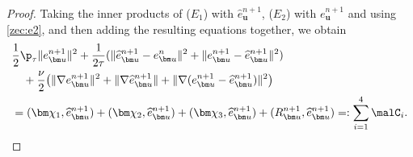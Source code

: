 \begin{proof}
	Taking the inner products of ($E_1$) with $\widehat{e}_{\bm u}^{n+1}$, ($E_2$) with $e_{\bm u}^{n+1}$ and using \eqref{zec:e2}, and then adding the resulting equations together, we obtain
	\begin{equation} \label{err:euhat:1}
		\begin{aligned}
			& \frac{1}{2}\p_\tau \|e_{\bm u}^{n+1}\|^2 +\frac{1}{2\tau}(\|\widehat{e}_{\bm u}^{n+1}-e_{\bm u}^n\|^2+\|e_{\bm u}^{n+1}-\widehat{e}_{\bm u}^{n+1}\|^2) \\
			& \quad +\frac{\nu}{2}\big(\|\nabla e_{\bm u}^{n+1}\|^2+\|\nabla \widehat{e}_{\bm u}^{n+1}\|+ \|\nabla(e_{\bm u}^{n+1}-\widehat{e}_{\bm u}^{n+1})\|^2\big) \\
			&  = (\bm \chi_1, \widehat{e}_{\bm u}^{n+1}) +(\bm \chi_2, \widehat{e}_{\bm u}^{n+1}) + (\bm \chi_3, \widehat{e}_{\bm u}^{n+1}) +(R_{\bm u}^{n+1}, \widehat{e}_{\bm u}^{n+1})
			=:\sum\limits_{i=1}^4 {\malC}_i.
		\end{aligned}
	\end{equation}
	

\end{proof}
